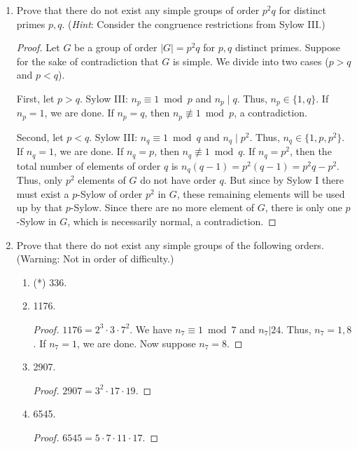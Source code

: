 \documentclass[../psets.tex]{subfiles}
\begin{document}
\begin{enumerate}
\begin{proof}
        Every $p$-Sylow of $N$ is a $p$-Sylow of $G$.
        Suppose for the sake of contradiction that there exists a $p$-Sylow $Q\subset G$ such that $Q\not\subset N$.
        Let $P$ be a $p$-Sylow of $N$ (guaranteed to exist by Sylow I).
        Sylow II: There exists $g\in G$ such that $gPg^{-1}=Q$. In particular, let $q\in Q$ be such that $q\notin N$. Then $q=gpg^{-1}$ for some $p\in P\subset N$. But this implies that not all $p\in N$ satisfy $gpg^{-1}\in N$, a contradiction.
    \end{proof}
    \item Prove that there do not exist any simple groups of order $p^2q$ for distinct primes $p,q$. (\emph{Hint}: Consider the congruence restrictions from Sylow III.)
    \begin{proof}
        Let $G$ be a group of order $|G|=p^2q$ for $p,q$ distinct primes. Suppose for the sake of contradiction that $G$ is simple. We divide into two cases ($p>q$ and $p<q$).\par
        First, let $p>q$. Sylow III: $n_p\equiv 1\bmod p$ and $n_p\mid q$. Thus, $n_p\in\{1,q\}$. If $n_p=1$, we are done. If $n_p=q$, then $n_p\not\equiv 1\bmod p$, a contradiction.\par
        Second, let $p<q$. Sylow III: $n_q\equiv 1\bmod q$ and $n_q\mid p^2$. Thus, $n_q\in\{1,p,p^2\}$. If $n_q=1$, we are done. If $n_q=p$, then $n_q\not\equiv 1\bmod q$. If $n_q=p^2$, then the total number of elements of order $q$ is $n_q(q-1)=p^2(q-1)=p^2q-p^2$. Thus, only $p^2$ elements of $G$ do not have order $q$. But since by Sylow I there must exist a $p$-Sylow of order $p^2$ in $G$, these remaining elements will be used up by that $p$-Sylow. Since there are no more element of $G$, there is only one $p$-Sylow in $G$, which is necessarily normal, a contradiction.
    \end{proof}
    \item Prove that there do not exist any simple groups of the following orders. (Warning: Not in order of difficulty.)
    \begin{enumerate}
        \item (*) 336.
        \item 1176.
        \begin{proof}
            $1176=2^3\cdot 3\cdot 7^2$. We have $n_7\equiv 1\bmod 7$ and $n_7|24$. Thus, $n_7=1,8$. If $n_7=1$, we are done. Now suppose $n_7=8$.
        \end{proof}
        \item 2907.
        \begin{proof}
            $2907=3^2\cdot 17\cdot 19$.
        \end{proof}
        \item 6545.
        \begin{proof}
            $6545=5\cdot 7\cdot 11\cdot 17$.
        \end{proof}
    \end{enumerate}
\end{enumerate}
\end{document}
